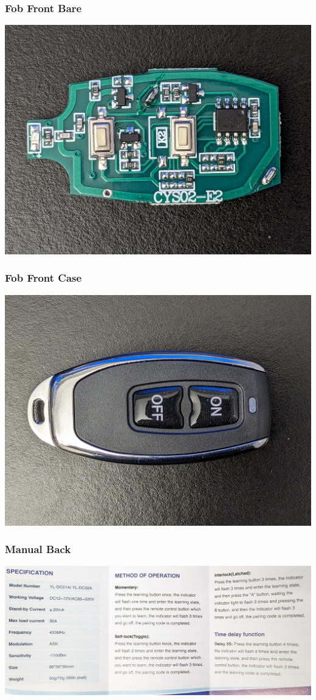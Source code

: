\documentclass{beamer}
\begin{document}
\begin{frame}
\frametitle{Fob Front Bare}
\includegraphics[width=\textwidth]{../Pics/device/fob_front_bare.jpg}
\end{frame}

\begin{frame}
\frametitle{Fob Front Case}
\includegraphics[width=\textwidth]{../Pics/device/fob_front_case.jpg}
\end{frame}

\begin{frame}
\frametitle{Manual Back}
\includegraphics[width=\textwidth]{../Pics/device/manual_back.jpg}
\end{frame}
\end{document}
